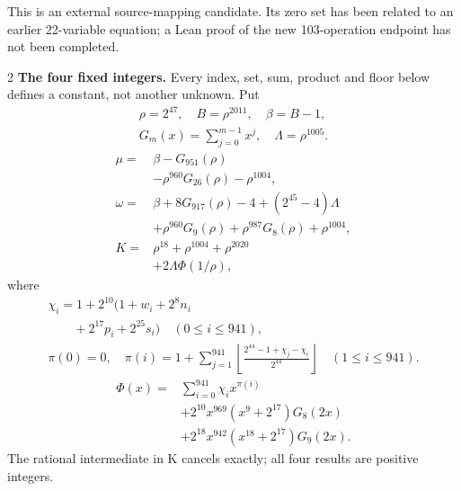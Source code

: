\documentclass[10pt]{article}
\newcommand{\fl}[1]{\left\lfloor#1\right\rfloor}
\begin{document}
This is an external source-mapping candidate. Its zero set has been related to
an earlier 22-variable equation; a Lean proof of the new 103-operation endpoint
has not been completed.
\bigskip
\begin{multicols}{2}\fontsize{7.7}{8.2}\selectfont
\textbf{The four fixed integers.}
Every index, set, sum, product and floor below defines a constant, not
another unknown. Put
\[
\begin{gathered}
\rho=2^{47},\quad B=\rho^{2011},\quad\beta=B-1,\\
G_m(x)=\sum_{j=0}^{m-1}x^j,\quad
\Lambda=\rho^{1005}.
\end{gathered}
\]
\begin{align*}
\mu={}&\beta-G_{951}(\rho)\\
&-\rho^{960}G_{26}(\rho)-\rho^{1004},\\
\omega={}&\beta+8G_{917}(\rho)-4+(2^{45}-4)\Lambda\\
&+\rho^{960}G_9(\rho)+\rho^{987}G_8(\rho)
  +\rho^{1004},\\
K={}&\rho^{18}+\rho^{1004}+\rho^{2020}\\
&+2\Lambda\Phi(1/\rho),
\end{align*}
where
\[
\begin{gathered}
\chi_i=1+2^{10}(1+w_i+2^8n_i\\
\qquad+2^{17}p_i+2^{25}s_i)\quad(0\le i\le941),\\
\pi(0)=0,\quad\pi(i)=1+\sum_{j=1}^{941}
\fl{\frac{2^{44}-1+\chi_j-\chi_i}{2^{44}}}\quad(1\le i\le941).
\end{gathered}
\]
\[
\begin{split}
\Phi(x)={}&\sum_{i=0}^{941}\chi_i x^{\pi(i)}\\
&+2^{10}x^{969}(x^9+2^{17})G_8(2x)\\
&+2^{18}x^{942}(x^{18}+2^{17})G_9(2x).
\end{split}
\]
The rational intermediate in K cancels exactly; all four results are positive integers.


\end{multicols}
\end{document}
